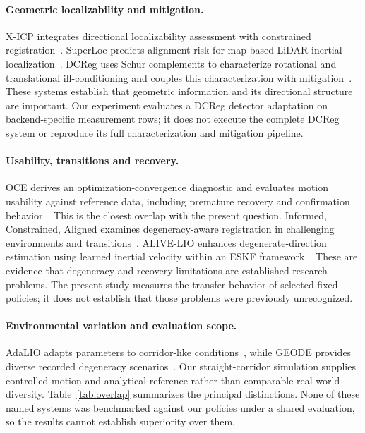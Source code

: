 \documentclass[11pt,a4paper]{article}
\begin{document}
\paragraph{Geometric localizability and mitigation.}
X-ICP integrates directional localizability assessment with constrained
registration~\cite{xicp}. SuperLoc predicts alignment risk for map-based
LiDAR-inertial localization~\cite{superloc}. DCReg uses Schur complements
to characterize rotational and translational ill-conditioning and couples
this characterization with mitigation~\cite{dcreg}. These systems establish
that geometric information and its directional structure are important.
Our experiment evaluates a DCReg detector adaptation on backend-specific
measurement rows; it does not execute the complete DCReg system or reproduce
its full characterization and mitigation pipeline.

\paragraph{Usability, transitions and recovery.}
OCE derives an optimization-convergence diagnostic and evaluates motion
usability against reference data, including premature recovery and
confirmation behavior~\cite{oce}. This is the closest overlap with the
present question. Informed, Constrained, Aligned examines degeneracy-aware
registration in challenging environments and transitions~\cite{ica}.
ALIVE-LIO enhances degenerate-direction estimation using learned inertial
velocity within an ESKF framework~\cite{alive}. These are evidence that
degeneracy and recovery limitations are established research problems.
The present study measures the transfer behavior of selected fixed policies;
it does not establish that those problems were previously unrecognized.

\paragraph{Environmental variation and evaluation scope.}
AdaLIO adapts parameters to corridor-like conditions~\cite{adalio}, while
GEODE provides diverse recorded degeneracy scenarios~\cite{geode}.
Our straight-corridor simulation supplies controlled motion and analytical
reference rather than comparable real-world diversity. Table~\ref{tab:overlap}
summarizes the principal distinctions. None of these named systems was
benchmarked against our policies under a shared evaluation, so the results
cannot establish superiority over them.
\end{document}
